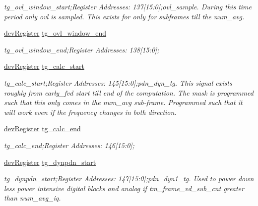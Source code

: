 \begin{DoxyCompactItemize}
\begin{DoxyCompactList}\small\item\em tg\+\_\+ovl\+\_\+window\+\_\+start;Register Addresses\+: 137\mbox{[}15\+:0\mbox{]};ovl\+\_\+sample. During this time period only ovl is sampled. This exists for only for subframes till the num\+\_\+avg. \end{DoxyCompactList}\item 
\mbox{\hyperlink{classdev_register}{dev\+Register}} \mbox{\hyperlink{class_o_p_t3101_registers_ab35d3589bd1db9149f621c33ea3624d6}{tg\+\_\+ovl\+\_\+window\+\_\+end}}
\begin{DoxyCompactList}\small\item\em tg\+\_\+ovl\+\_\+window\+\_\+end;Register Addresses\+: 138\mbox{[}15\+:0\mbox{]}; \end{DoxyCompactList}\item 
\mbox{\hyperlink{classdev_register}{dev\+Register}} \mbox{\hyperlink{class_o_p_t3101_registers_a7ff5cef71891b055902c660ff8eedc20}{tg\+\_\+calc\+\_\+start}}
\begin{DoxyCompactList}\small\item\em tg\+\_\+calc\+\_\+start;Register Addresses\+: 145\mbox{[}15\+:0\mbox{]};pdn\+\_\+dyn\+\_\+tg. This signal exists roughly from early\+\_\+fvd start till end of the computation. The mask is programmed such that this only comes in the num\+\_\+avg sub-\/frame. Programmed such that it will work even if the frequency changes in both direction. \end{DoxyCompactList}\item 
\mbox{\hyperlink{classdev_register}{dev\+Register}} \mbox{\hyperlink{class_o_p_t3101_registers_a3d0b4360904c3375d958b5d80f14b591}{tg\+\_\+calc\+\_\+end}}
\begin{DoxyCompactList}\small\item\em tg\+\_\+calc\+\_\+end;Register Addresses\+: 146\mbox{[}15\+:0\mbox{]}; \end{DoxyCompactList}\item 
\mbox{\hyperlink{classdev_register}{dev\+Register}} \mbox{\hyperlink{class_o_p_t3101_registers_acc476f02740652cbbb2879dc7fc372b4}{tg\+\_\+dynpdn\+\_\+start}}
\begin{DoxyCompactList}\small\item\em tg\+\_\+dynpdn\+\_\+start;Register Addresses\+: 147\mbox{[}15\+:0\mbox{]};pdn\+\_\+dyn1\+\_\+tg. Used to power down less power intensive digital blocks and analog if tm\+\_\+frame\+\_\+vd\+\_\+sub\+\_\+cnt greater than num\+\_\+avg\+\_\+iq. \end{DoxyCompactList}\item 

\end{DoxyCompactItemize}
